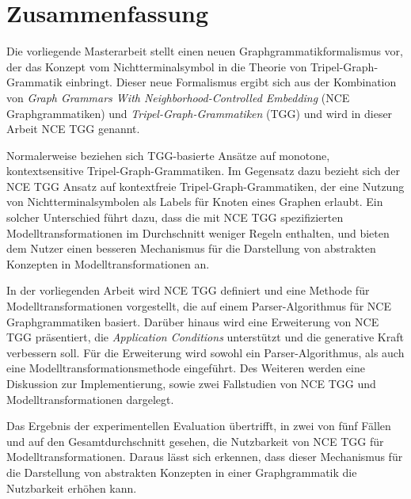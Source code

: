\chapter*{Zusammenfassung}

Die vorliegende Masterarbeit stellt einen neuen Graphgrammatikformalismus vor, der das Konzept vom Nichtterminalsymbol in die Theorie von Tripel-Graph-Grammatik einbringt. Dieser neue Formalismus ergibt sich aus der Kombination von \emph{Graph Grammars With Neighborhood-Controlled Embedding} (NCE Graphgrammatiken) und \emph{Tripel-Graph-Grammatiken} (TGG) und wird in dieser Arbeit NCE TGG genannt.

Normalerweise beziehen sich TGG-basierte Ansätze auf monotone, kontextsensitive Tripel-Graph-Grammatiken. Im Gegensatz dazu bezieht sich der NCE TGG Ansatz auf kontextfreie Tripel-Graph-Grammatiken, der eine Nutzung von Nichtterminalsymbolen als Labels für Knoten eines Graphen erlaubt. Ein solcher Unterschied führt dazu, dass die mit NCE TGG spezifizierten Modelltransformationen im Durchschnitt weniger Regeln enthalten, und bieten dem Nutzer einen besseren Mechanismus für die Darstellung von abstrakten Konzepten in Modelltransformationen an.

In der vorliegenden Arbeit wird NCE TGG definiert und eine Methode für Modelltransformationen vorgestellt, die auf einem Parser-Algorithmus für NCE Graphgrammatiken basiert. Darüber hinaus wird eine Erweiterung von NCE TGG präsentiert, die \emph{Application Conditions} unterstützt und die generative Kraft verbessern soll. Für die Erweiterung wird sowohl ein Parser-Algorithmus, als auch eine Modelltransformationsmethode eingeführt. Des Weiteren werden eine Diskussion zur Implementierung, sowie zwei Fallstudien von NCE TGG und Modelltransformationen dargelegt.

Das Ergebnis der experimentellen Evaluation übertrifft, in zwei von fünf Fällen und auf den Gesamtdurchschnitt gesehen, die Nutzbarkeit von NCE TGG für Modelltransformationen. Daraus lässt sich erkennen, dass dieser Mechanismus für die Darstellung von abstrakten Konzepten in einer Graphgrammatik die Nutzbarkeit erhöhen kann.